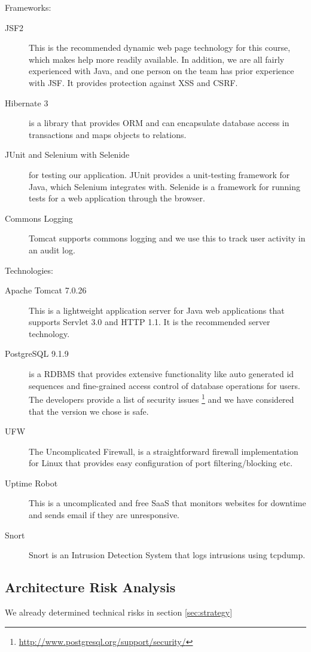 \documentclass[a4paper]{article}
\begin{document}
Frameworks:
\begin{description}
\item[JSF2] This is the recommended dynamic web page technology for this course, which makes help more readily available. In addition, we are all fairly experienced with Java, and one person on the team has prior experience with JSF. It provides protection against XSS and CSRF. 
\item[Hibernate 3] is a library that provides ORM and can encapsulate database access in transactions and maps objects to relations.
\item[JUnit and Selenium with Selenide] for testing our application. JUnit provides a unit-testing framework for Java, which Selenium integrates with. Selenide is a framework for running tests for a web application through the browser.
\item[Commons Logging]
Tomcat supports commons logging and we use this to track user activity in an audit log.
\end{description}
Technologies:
\begin{description}
\item[Apache Tomcat 7.0.26] This is a lightweight application server for Java web applications that supports Servlet 3.0 and HTTP 1.1. It is the recommended server technology. 
\item[PostgreSQL 9.1.9] is a RDBMS that provides extensive functionality like auto generated id sequences and fine-grained access control of database operations for users. The developers provide a list of security issues \footnote{\href{http://www.postgresql.org/support/security/}{http://www.postgresql.org/support/security/}} and we have considered that the version we chose is safe.
\item[UFW] The Uncomplicated Firewall, is a straightforward firewall implementation for Linux that provides easy configuration of port filtering/blocking etc.
\item[Uptime Robot] This is a uncomplicated and free SaaS that monitors websites for downtime and sends email if they are unresponsive.
\item[Snort] Snort is an Intrusion Detection System that logs intrusions using tcpdump.
\end{description}

\subsection{Architecture Risk Analysis}
We already determined technical risks in section \ref{sec:strategy}
\end{document}
